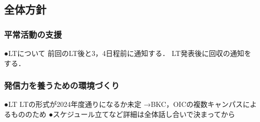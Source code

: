 \subsection*{全体方針}


\subsubsection*{平常活動の支援}
●LTについて
 前回のLT後と3，4日程前に通知する．
 LT発表後に回収の通知をする．

\subsubsection*{発信力を養うための環境づくり}
●LT 
 LTの形式が2024年度通りになるか未定
  →BKC，OICの複数キャンパスによるもののため
  ●スケジュール立てなど詳細は全体話し合いで決まってから

